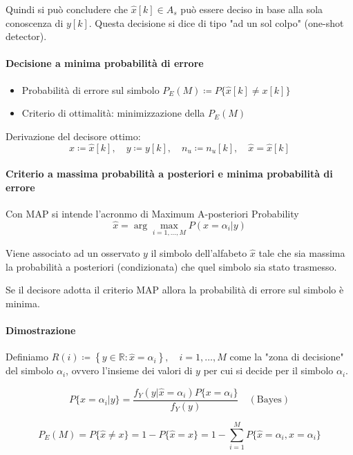 Quindi si può concludere che $\hat{x}[k] \in A_s $ può essere deciso in base alla sola conoscenza di $y[k]$. Questa decisione si dice di tipo "ad un sol colpo" (one-shot detector).

\paragraph{Decisione a minima probabilità di errore}

\begin{itemize}
    \item Probabilità di errore sul simbolo
          \(
          P_E(M) \coloneqq P\{\hat{x}[k] \neq x[k]\}
          \)
    \item
          Criterio di ottimalità: minimizzazione della $P_E(M)$

\end{itemize}

Derivazione del decisore ottimo:
\[
    x \coloneqq \hat{x}[k], \quad y \coloneqq y[k], \quad n_u \coloneqq n_u[k], \quad \hat{x} = \hat{x}[k]
\]

\paragraph{Criterio a massima probabilità a posteriori e minima probabilità di errore}
Con
MAP si intende l'acronmo di Maximum A-posteriori Probability
\[
    \hat{x} = \arg\max_{i=1,\ldots,M} P(x=\alpha_i|y)
\]

Viene associato ad un osservato $y$ il simbolo dell'alfabeto $\hat{x}$ tale che sia massima la probabilità a posteriori (condizionata) che quel simbolo sia stato trasmesso.

Se il decisore adotta il criterio MAP allora la probabilità di errore sul simbolo è minima.


\paragraph{Dimostrazione}

Definiamo
\(
R(i) \coloneqq \left\{ y \in \mathbb{R} : \hat{x} = \alpha_i \right\}, \quad i = 1,\ldots,M
\)
come la "zona di decisione" del simbolo $\alpha_i$, ovvero l'insieme dei valori di $y$ per cui si decide per il simbolo $\alpha_i$.

\[
    P\{x = \alpha_i | y\} = \frac{f_Y(y | \hat{x} = \alpha_i) P\{x = \alpha_i\}}{f_Y(y)} \quad (\text{Bayes})
\]

\[
    P_E(M) = P\{\hat{x} \neq x\} = 1 - P\{\hat{x} = x\} = 1 - \sum_{i=1}^M P\{\hat{x} = \alpha_i, x = \alpha_i\}
\]

